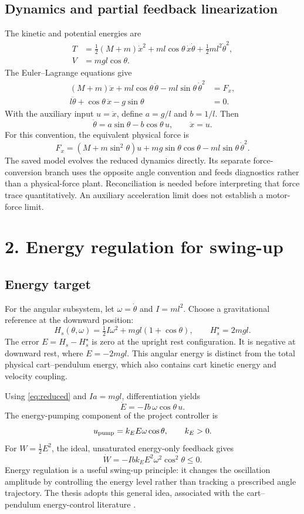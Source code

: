 \documentclass[11pt,a4paper]{article}
\newcommand{\reportsection}[1]{\section*{\color{navy}#1}}
\newcommand{\topic}[1]{\subsection*{\color{teal}#1}}
\begin{document}
\topic{Dynamics and partial feedback linearization}
The kinetic and potential energies are
\begin{align}
 T&=\tfrac12(M+m)\dot x^2+ml\cos\theta\,\dot x\dot\theta+\tfrac12ml^2\dot\theta^2,\\
 V&=mgl\cos\theta.
\end{align}
The Euler--Lagrange equations give
\begin{align}
 (M+m)\ddot x+ml\cos\theta\,\ddot\theta-ml\sin\theta\,\dot\theta^2&=F_x,\\
 l\ddot\theta+\cos\theta\,\ddot x-g\sin\theta&=0.
\end{align}
With the auxiliary input $u=\ddot x$, define $a=g/l$ and $b=1/l$. Then
\begin{equation}\label{eq:reduced}
 \ddot\theta=a\sin\theta-b\cos\theta\,u,\qquad\ddot x=u.
\end{equation}
For this convention, the equivalent physical force is
\begin{equation}
 F_x=(M+m\sin^2\theta)u+mg\sin\theta\cos\theta-ml\sin\theta\,\dot\theta^2.
\end{equation}
The saved model evolves the reduced dynamics directly. Its separate force-conversion branch uses the opposite angle convention and feeds diagnostics rather than a physical-force plant. Reconciliation is needed before interpreting that force trace quantitatively. An auxiliary acceleration limit does not establish a motor-force limit.

\clearpage
\reportsection{2. Energy regulation for swing-up}
\topic{Energy target}
For the angular subsystem, let $\omega=\dot\theta$ and $I=ml^2$. Choose a gravitational reference at the downward position:
\begin{equation}
 H_s(\theta,\omega)=\tfrac12 I\omega^2+mgl(1+\cos\theta),
 \qquad H_s^{\star}=2mgl.
\end{equation}
The error $E=H_s-H_s^{\star}$ is zero at the upright rest configuration. It is negative at downward rest, where $E=-2mgl$. This angular energy is distinct from the total physical cart--pendulum energy, which also contains cart kinetic energy and velocity coupling.

Using \eqref{eq:reduced} and $Ia=mgl$, differentiation yields
\begin{equation}
 \dot E=-Ib\,\omega\cos\theta\,u.
\end{equation}
The energy-pumping component of the project controller is
\begin{equation}
 u_{\rm pump}=k_E E\omega\cos\theta,\qquad k_E>0.
\end{equation}
For $W=\tfrac12E^2$, the ideal, unsaturated energy-only feedback gives
\begin{equation}\label{eq:energydecay}
 \dot W=-Ib k_E E^2\omega^2\cos^2\theta\leq0.
\end{equation}
Energy regulation is a useful swing-up principle: it changes the oscillation amplitude by controlling the energy level rather than tracking a prescribed angle trajectory. The thesis adopts this general idea, associated with the cart--pendulum energy-control literature \cite{chung,thesis}.
\end{document}
